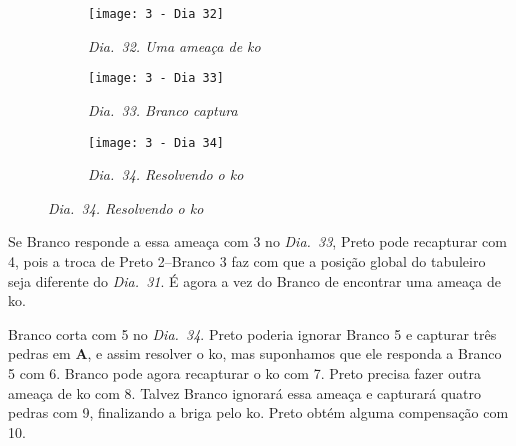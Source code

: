 \begin{figure}[h]
  \centering
  \begin{subfigure}[t]{.3\textwidth}
      \centering
      \texttt{[image: 3 - Dia 32]}
      \caption*{\emph{Dia.\@~32. Uma ameaça de ko}}
  \end{subfigure}
  \hfill
  \begin{subfigure}[t]{.3\textwidth}
      \centering
      \texttt{[image: 3 - Dia 33]}
      \caption*{\emph{Dia.\@~33. Branco captura}}
  \end{subfigure}
  \hfill
  \begin{subfigure}[t]{.3\textwidth}
      \centering
      \texttt{[image: 3 - Dia 34]}
      \caption*{\emph{Dia.\@~34. Resolvendo o ko}}
  \end{subfigure}
\end{figure}

Se Branco responde a essa ameaça com 3 no \emph{Dia.\@~33}, Preto pode recapturar com 4, pois a troca de Preto 2--Branco 3 faz com que a posição global do tabuleiro seja diferente do \emph{Dia.\@~31}. É agora a vez do Branco de encontrar uma ameaça de ko.

Branco corta com 5 no \emph{Dia.\@~34}. Preto poderia ignorar Branco 5 e capturar três pedras em \textbf{A}, e assim  resolver o ko, mas suponhamos que ele responda a Branco 5 com 6. Branco pode agora recapturar o ko com 7. Preto precisa fazer outra ameaça de ko com 8. Talvez Branco ignorará essa ameaça e capturará quatro pedras com 9, finalizando a briga pelo ko. Preto obtém alguma compensação com 10.